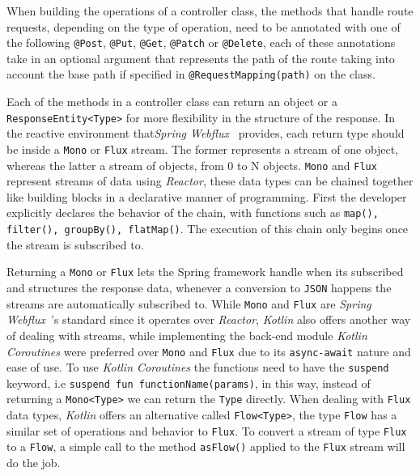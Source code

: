 When building the operations of a controller class, the methods that handle route requests, depending on the type of operation, need to be annotated with one of the following \lstinline{@Post}, \lstinline{@Put}, \lstinline{@Get}, \lstinline{@Patch} or \lstinline{@Delete}, each of these annotations take in an optional argument that represents the path of the route taking into account the base path if specified in \lstinline{@RequestMapping(path)} on the class. 

Each of the methods in a controller class can return an object or a \lstinline{ResponseEntity<Type>} for more flexibility in the structure of the response. In the reactive environment that\textit{Spring Webflux}~\cite{spring-webflux} provides, each return type should be inside a \lstinline{Mono} or \lstinline{Flux} stream.
The former represents a stream of one object, whereas the latter a stream of objects, from 0 to N objects. \lstinline{Mono} and \lstinline{Flux} represent streams of data using \textit{Reactor}, these data types can be chained together like building blocks in a declarative manner of programming. First the developer explicitly declares the behavior of the chain, with functions such as \lstinline{map(), filter(), groupBy(), flatMap()}. The execution of this chain only begins once the stream is subscribed to. 

Returning a \lstinline{Mono} or \lstinline{Flux} lets the Spring framework handle when its subscribed and structures the response data, whenever a conversion to \lstinline{JSON} happens the streams are automatically subscribed to.
While \lstinline{Mono} and \lstinline{Flux} are \textit{Spring Webflux}~\cite{spring-webflux}'s standard since it operates over \textit{Reactor}, \textit{Kotlin} also offers another way of dealing with streams, while implementing the back-end module \textit{Kotlin Coroutines} were preferred over \lstinline{Mono} and \lstinline{Flux} due to its \lstinline{async-await} nature and ease of use. To use \textit{Kotlin Coroutines} the functions need to have the \lstinline{suspend} keyword, i.e \lstinline{suspend fun functionName(params)}, in this way, instead of returning a \lstinline{Mono<Type>} we can return the \lstinline{Type} directly. When dealing with \lstinline{Flux} data types, \textit{Kotlin} offers an alternative called \lstinline{Flow<Type>}, the type \lstinline{Flow} has a similar set of operations and behavior to \lstinline{Flux}. To convert a stream of type \lstinline{Flux} to a \lstinline{Flow}, a simple call to the method \lstinline{asFlow()} applied to the \lstinline{Flux} stream will do the job.

